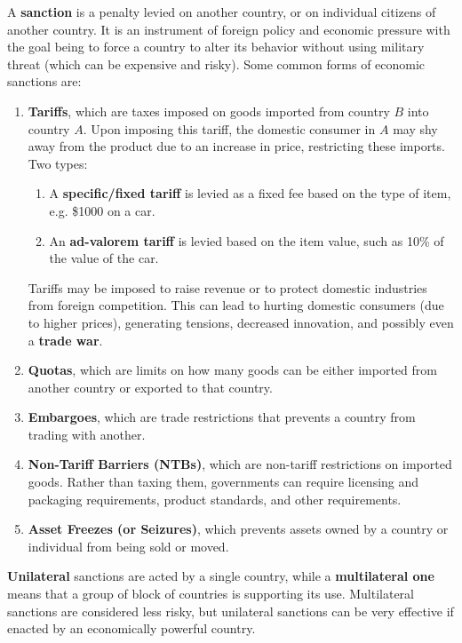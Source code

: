 \documentclass{article}
\begin{document}
      \begin{definition}
        A \textbf{sanction} is a penalty levied on another country, or on individual citizens of another country. It is an instrument of foreign policy and economic pressure with the goal being to force a country to alter its behavior without using military threat (which can be expensive and risky). Some common forms of economic sanctions are: 
        \begin{enumerate}
            \item \textbf{Tariffs}, which are taxes imposed on goods imported from country $B$ into country $A$. Upon imposing this tariff, the domestic consumer in $A$ may shy away from the product due to an increase in price, restricting these imports. Two types: 
            \begin{enumerate}
                \item A \textbf{specific/fixed tariff} is levied as a fixed fee based on the type of item, e.g. \$1000 on a car. 
                \item An \textbf{ad-valorem tariff} is levied based on the item value, such as 10\% of the value of the car. 
            \end{enumerate}
            Tariffs may be imposed to raise revenue or to protect domestic industries from foreign competition. This can lead to hurting domestic consumers (due to higher prices), generating tensions, decreased innovation, and possibly even a \textbf{trade war}. 
            \item \textbf{Quotas}, which are limits on how many goods can be either imported from another country or exported to that country. 
            \item \textbf{Embargoes}, which are trade restrictions that prevents a country from trading with another. 
            \item \textbf{Non-Tariff Barriers (NTBs)}, which are non-tariff restrictions on imported goods. Rather than taxing them, governments can require licensing and packaging requirements, product standards, and other requirements. 
            \item \textbf{Asset Freezes (or Seizures)}, which prevents assets owned by a country or individual from being sold or moved. 
        \end{enumerate}
        \textbf{Unilateral} sanctions are acted by a single country, while a \textbf{multilateral one} means that a group of block of countries is supporting its use. Multilateral sanctions are considered less risky, but unilateral sanctions can be very effective if enacted by an economically powerful country. 
      \end{definition}
\end{document}

